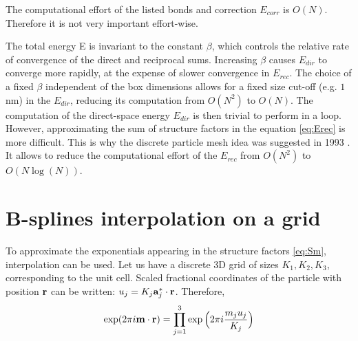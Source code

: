 \documentclass[12pt,a4paper]{report}
\newcommand{\draft}[1]{#1}
\begin{document}

The computational effort of the listed bonds and correction $E_{corr}$ is $O(N)$. Therefore it is not very important effort-wise.

The total energy E is invariant to the constant $\beta$, which
controls the relative rate of convergence of the direct and
reciprocal sums. Increasing $\beta$ causes $E_{dir}$ to converge more
rapidly, at the expense of slower convergence in $E_{rec}$.
The choice of a fixed $\beta$ independent of the box
dimensions allows for a fixed size cut-off (e.g. $1$ nm) in the
$E_{dir}$, reducing its computation from $O(N^2)$ to $O(N)$.
The computation of the direct-space energy $E_{dir}$ is then trivial to perform in a loop. However, approximating the sum of structure factors in the equation \eqref{eq:Erec} is more difficult. This is why the discrete particle mesh idea was suggested in 1993 \cite{pme}. It allows to reduce the computational effort of the $E_{rec}$ from $O(N^2)$ to  $O(N \log (N))$.


\section{B-splines interpolation on a grid}
To approximate the exponentials appearing in the structure factors \eqref{eq:Sm}, interpolation can be used. Let us have a discrete 3D grid of sizes $K_1, K_2, K_3$, corresponding to the  unit cell. Scaled fractional coordinates of the particle with position $\bold{r}$ can be written: $u_j = K_j \bold{a}_j^*\cdot  \bold{r}$. 
Therefore, 
\[\exp(2\pi i\bold{m}\cdot\bold{r}) = \prod\limits_{j=1}^3\exp\Big(2\pi i\frac{m_j u_j}{K_j}\Big)\]


\end{document}
